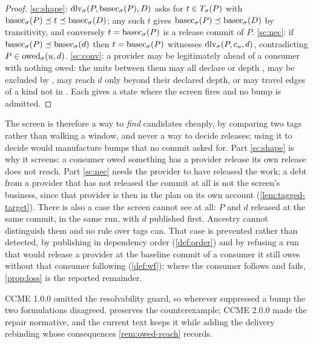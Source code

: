 \begin{proof}
\ref{sc:shape}: $\mathrm{dlv}_{\sigma}(P,\mathrm{basec}_{\sigma}(P),D)$ asks for $t \in
T_{\sigma}(P)$ with $\mathrm{basec}_{\sigma}(P) \preceq t \preceq \mathrm{basec}_{\sigma}(D)$; any such $t$
gives $\mathrm{basec}_{\sigma}(P) \preceq \mathrm{basec}_{\sigma}(D)$ by transitivity, and conversely $t =
\mathrm{basec}_{\sigma}(P)$ is a release commit of $P$.
\ref{sc:nec}: if $\mathrm{basec}_{\sigma}(P) \preceq \mathrm{basec}_{\sigma}(d)$ then $t = \mathrm{basec}_{\sigma}(P)$
witnesses $\mathrm{dlv}_{\sigma}(P,c_{u},d)$, contradicting $P \in
\mathrm{owed}_{\sigma}(u,d)$.
\ref{sc:conv}: a provider may be legitimately ahead of a consumer with
nothing owed: the units between them may all declare  or depth
, may be excluded by , may reach $d$ only beyond
their declared depth, or may travel edges of a kind not in
. Each gives a state where the screen fires and no bump
is admitted.
\end{proof}

The screen is therefore a way to \emph{find} candidates cheaply, by comparing
two tags rather than walking a window, and never a way to decide releases;
using it to decide would manufacture bumps that no commit asked for. Part
\ref{sc:shape} is why it screens: a consumer owed something has a provider
release its own release does not reach. Part \ref{sc:nec} needs the provider
to have released the work; a debt from a provider that has not released the
commit at all is not the screen's business, since that provider is then in
the plan on its own account (\cref{lem:tagged-target}). There is also a case
the screen cannot see at all: $P$ and $d$ released at the same commit, in the
same run, with $d$ published first. Ancestry cannot distinguish them and no
rule over tags can. That case is prevented rather than detected, by publishing
in dependency order (\cref{def:order}) and by refusing a run that would
release a provider at the baseline commit of a consumer it still owes without
that consumer following (\cref{def:wf}); where the consumer follows and fails,
\cref{prop:loss} is the reported remainder.

\begin{remark}
\label{rem:duality-hyp}
CCME 1.0.0 omitted the resolvability guard, so wherever  suppressed
a bump the two formulations disagreed.  preserves the
counterexample; CCME 2.0.0 made the repair normative, and the current text
keeps it while adding the delivery rebinding whose consequences
\cref{rem:owed-reach} records.
\end{remark}
